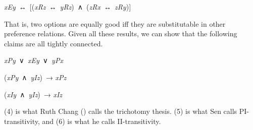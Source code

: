 \documentclass[
  10.5pt,
  twoside]{article}
\providecommand{\tightlist}{%
  \setlength{\itemsep}{0pt}\setlength{\parskip}{0pt}}
\let\oldenumerate\enumerate
\let\endoldenumerate\endenumerate
\renewenvironment{enumerate}
  {\vskip 5pt\oldenumerate}
  {\endoldenumerate\vskip 5pt}
\begin{document}
\begin{enumerate}
\def\labelenumi{(\arabic{enumi})}
\setcounter{enumi}{2}
\tightlist
\item
  \emph{xEy}~↔︎~{[}(\emph{xRz}~↔︎~\emph{yRz})~∧~(\emph{zRx}~↔︎~\emph{zRy}){]}
\end{enumerate}

That is, two options are equally good iff they are substitutable in
other preference relations. Given all these results, we can show that
the following claims are all tightly connected.

\begin{enumerate}
\def\labelenumi{(\arabic{enumi})}
\setcounter{enumi}{3}
\tightlist
\item
  \emph{xPy}~∨~\emph{xEy}~∨~\emph{yPx}
\item
  (\emph{xPy}~∧~\emph{yIz})~→ \emph{xPz}
\item
  (\emph{xIy}~∧~\emph{yIz})~→ \emph{xIz}
\end{enumerate}

(4) is what Ruth Chang () calls the
trichotomy thesis. (5) is what Sen calls PI-transitivity, and (6) is
what he calls II-transitivity.
\end{document}
